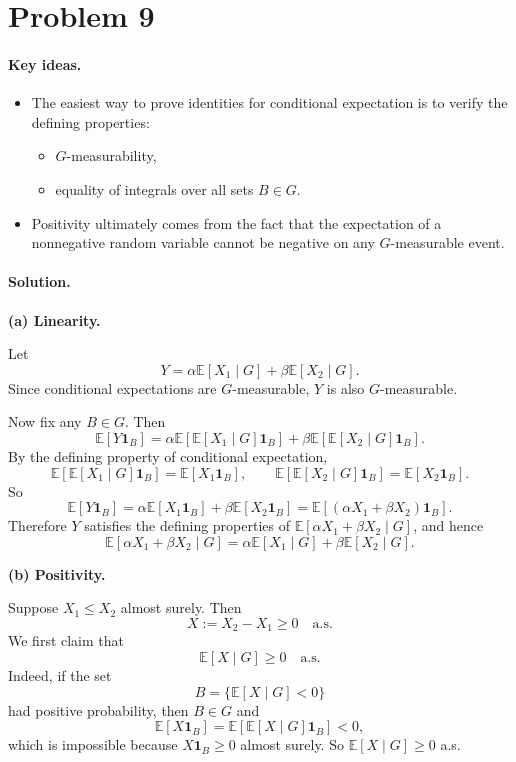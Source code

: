 \documentclass[11pt]{article}
\newcommand{\E}{\mathbb{E}}
\newcommand{\1}{\mathbf{1}}
\begin{document}
\section*{Problem 9}
\paragraph{Key ideas.}
\begin{itemize}
    \item The easiest way to prove identities for conditional expectation is to verify the defining properties:
    \begin{itemize}
        \item \(G\)-measurability,
        \item equality of integrals over all sets \(B\in G\).
    \end{itemize}
    \item Positivity ultimately comes from the fact that the expectation of a nonnegative random variable cannot be negative on any \(G\)-measurable event.
\end{itemize}

\paragraph{Solution.}
\textbf{(a) Linearity.}

Let
\[
    Y=\alpha \E[X_1\mid G] + \beta \E[X_2\mid G].
\]
Since conditional expectations are \(G\)-measurable, \(Y\) is also \(G\)-measurable.

Now fix any \(B\in G\). Then
\[
    \E[Y\1_B]
    =
    \alpha \E\!\left[\E[X_1\mid G]\1_B\right]
    +
    \beta \E\!\left[\E[X_2\mid G]\1_B\right].
\]
By the defining property of conditional expectation,
\[
    \E\!\left[\E[X_1\mid G]\1_B\right]=\E[X_1\1_B],
    \qquad
    \E\!\left[\E[X_2\mid G]\1_B\right]=\E[X_2\1_B].
\]
So
\[
    \E[Y\1_B]
    =
    \alpha \E[X_1\1_B]+\beta \E[X_2\1_B]
    =
    \E[(\alpha X_1+\beta X_2)\1_B].
\]
Therefore \(Y\) satisfies the defining properties of \(\E[\alpha X_1+\beta X_2\mid G]\), and hence
\[
    \E[\alpha X_1+\beta X_2\mid G]
    =
    \alpha \E[X_1\mid G]+\beta \E[X_2\mid G].
\]

\textbf{(b) Positivity.}

Suppose \(X_1 \le X_2\) almost surely. Then
\[
    X:=X_2-X_1 \ge 0 \quad \text{a.s.}
\]
We first claim that
\[
    \E[X\mid G] \ge 0 \quad \text{a.s.}
\]
Indeed, if the set
\[
    B=\{\E[X\mid G]<0\}
\]
had positive probability, then \(B\in G\) and
\[
    \E[X\1_B]
    =
    \E[\E[X\mid G]\1_B]
    <0,
\]
which is impossible because \(X\1_B\ge 0\) almost surely. So \(\E[X\mid G]\ge 0\) a.s.
\end{document}
